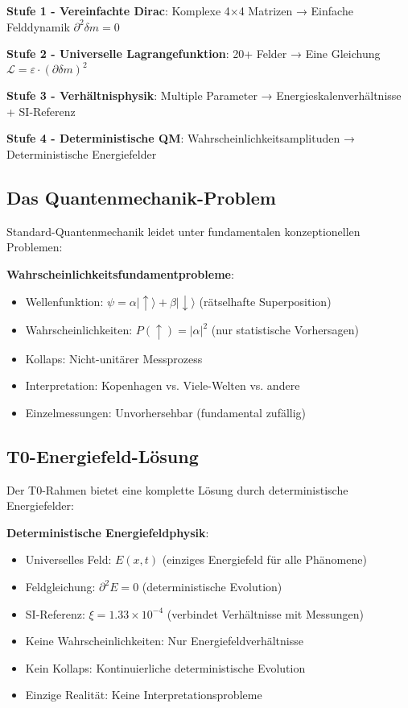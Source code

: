 \documentclass[12pt,a4paper]{article}
\newcommand{\Efield}{E}
\newcommand{\xipar}{\xi}
\begin{document}
	\textbf{Stufe 1 - Vereinfachte Dirac}: Komplexe 4×4 Matrizen → Einfache Felddynamik $\partial^2 \delta m = 0$
	
	\textbf{Stufe 2 - Universelle Lagrangefunktion}: 20+ Felder → Eine Gleichung $\mathcal{L} = \varepsilon \cdot (\partial \delta m)^2$
	
	\textbf{Stufe 3 - Verhältnisphysik}: Multiple Parameter → Energieskalenverhältnisse + SI-Referenz
	
	\textbf{Stufe 4 - Deterministische QM}: Wahrscheinlichkeitsamplituden → Deterministische Energiefelder
	
	\subsection{Das Quantenmechanik-Problem}
	
	Standard-Quantenmechanik leidet unter fundamentalen konzeptionellen Problemen:
	
	\begin{tcolorbox}[colback=red!5!white,colframe=red!75!black,title=Standard QM Probleme]
		\textbf{Wahrscheinlichkeitsfundamentprobleme}:
		\begin{itemize}
			\item Wellenfunktion: $\psi = \alpha|{\uparrow}\rangle + \beta|{\downarrow}\rangle$ (rätselhafte Superposition)
			\item Wahrscheinlichkeiten: $P(\uparrow) = |\alpha|^2$ (nur statistische Vorhersagen)
			\item Kollaps: Nicht-unitärer Messprozess
			\item Interpretation: Kopenhagen vs. Viele-Welten vs. andere
			\item Einzelmessungen: Unvorhersehbar (fundamental zufällig)
		\end{itemize}
	\end{tcolorbox}
	
	\subsection{T0-Energiefeld-Lösung}
	
	Der T0-Rahmen bietet eine komplette Lösung durch deterministische Energiefelder:
	
	\begin{tcolorbox}[colback=blue!5!white,colframe=blue!75!black,title=T0 Deterministisches Fundament]
		\textbf{Deterministische Energiefeldphysik}:
		\begin{itemize}
			\item Universelles Feld: $\Efield(x,t)$ (einziges Energiefeld für alle Phänomene)
			\item Feldgleichung: $\partial^2 \Efield = 0$ (deterministische Evolution)
			\item SI-Referenz: $\xipar = 1.33 \times 10^{-4}$ (verbindet Verhältnisse mit Messungen)
			\item Keine Wahrscheinlichkeiten: Nur Energiefeldverhältnisse
			\item Kein Kollaps: Kontinuierliche deterministische Evolution
			\item Einzige Realität: Keine Interpretationsprobleme
		\end{itemize}
	\end{tcolorbox}
	
\end{document}

